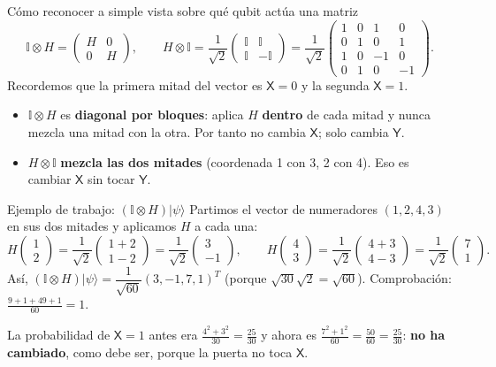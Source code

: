\documentclass[11pt, a4paper, twoside, openright]{report}
\providecommand{\ket}[1]{|#1\rangle}
\newcommand{\X}{\mathsf{X}}
\newcommand{\Y}{\mathsf{Y}}
\newcommand{\I}{\mathbb{I}}
\begin{document}
\begin{aclaracion}{Cómo reconocer a simple vista sobre qué qubit actúa una matriz}
\[
\I\otimes H=\begin{pmatrix} H&0\\0&H\end{pmatrix},
\qquad
H\otimes\I=\frac{1}{\sqrt2}\begin{pmatrix} \I&\I\\ \I&-\I\end{pmatrix}
=\frac{1}{\sqrt2}\begin{pmatrix} 1&0&1&0\\0&1&0&1\\1&0&-1&0\\0&1&0&-1\end{pmatrix}.
\]
Recordemos que la primera mitad del vector es $\X=0$ y la segunda $\X=1$.
\begin{itemize}
  \item $\I\otimes H$ es \textbf{diagonal por bloques}: aplica $H$ \textbf{dentro} de cada mitad y nunca mezcla una mitad con la otra. Por tanto no cambia $\X$; solo cambia $\Y$.
  \item $H\otimes\I$ \textbf{mezcla las dos mitades} (coordenada 1 con 3, 2 con 4). Eso es cambiar $\X$ sin tocar $\Y$.
\end{itemize}
\end{aclaracion}

\begin{ejemplo}{Ejemplo de trabajo: $(\I\otimes H)\ket\psi$}
Partimos el vector de numeradores $(1,2,4,3)$ en sus dos mitades y aplicamos $H$ a cada una:
\[
H\begin{pmatrix}1\\2\end{pmatrix}=\frac{1}{\sqrt2}\begin{pmatrix}1+2\\1-2\end{pmatrix}=\frac{1}{\sqrt2}\begin{pmatrix}3\\-1\end{pmatrix},
\qquad
H\begin{pmatrix}4\\3\end{pmatrix}=\frac{1}{\sqrt2}\begin{pmatrix}4+3\\4-3\end{pmatrix}=\frac{1}{\sqrt2}\begin{pmatrix}7\\1\end{pmatrix}.
\]
Así, $(\I\otimes H)\ket\psi=\dfrac{1}{\sqrt{60}}(3,-1,7,1)^T$ (porque $\sqrt{30}\sqrt2=\sqrt{60}$). Comprobación: $\frac{9+1+49+1}{60}=1$.

La probabilidad de $\X=1$ antes era $\frac{4^2+3^2}{30}=\frac{25}{30}$ y ahora es $\frac{7^2+1^2}{60}=\frac{50}{60}=\frac{25}{30}$: \textbf{no ha cambiado}, como debe ser, porque la puerta no toca $\X$.
\end{ejemplo}
\end{document}
